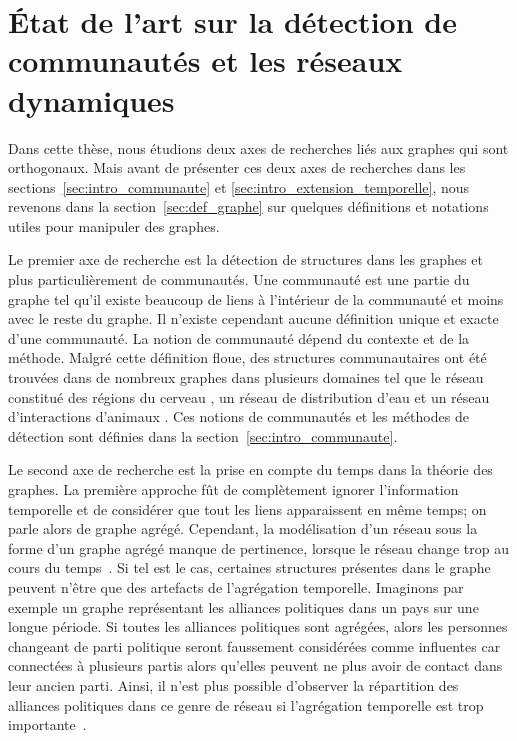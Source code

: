 
\chapter{État de l'art sur la détection de communautés et les réseaux dynamiques}
\minitoc
\label{chap:etat_art}
Dans cette thèse, nous étudions deux axes de recherches liés aux graphes qui sont orthogonaux.
Mais avant de présenter ces deux axes de recherches dans les sections~\ref{sec:intro_communaute} et \ref{sec:intro_extension_temporelle}, nous revenons dans la section~\ref{sec:def_graphe} sur quelques définitions et notations utiles pour manipuler des graphes.

Le premier axe de recherche est la détection de structures dans les graphes et plus particulièrement de communautés.
Une communauté est une partie du graphe tel qu'il existe beaucoup de liens à l'intérieur de la communauté et moins avec le reste du graphe.
Il n'existe cependant aucune définition unique et exacte d'une communauté.
La notion de communauté dépend du contexte et de la méthode.
Malgré cette définition floue, des structures communautaires ont été trouvées dans de nombreux graphes dans plusieurs domaines tel que le réseau constitué des régions du cerveau \cite{DeReus2014}, un réseau de distribution d'eau \cite{DiNardo2015} et un réseau d'interactions d'animaux \cite{Farine2015}.
Ces notions de communautés et les méthodes de détection sont définies dans la section~\ref{sec:intro_communaute}.

Le second axe de recherche est la prise en compte du temps dans la théorie des graphes.
La première approche fût de complètement ignorer l'information temporelle et de considérer que tout les liens apparaissent en même temps; on parle alors de graphe agrégé.
Cependant, la modélisation d'un réseau sous la forme d'un graphe agrégé manque de pertinence, lorsque le réseau change trop au cours du temps~\cite{Holme2015b}.
Si tel est le cas, certaines structures présentes dans le graphe peuvent n'être que des artefacts de l'agrégation temporelle.
Imaginons par exemple un graphe représentant les alliances politiques dans un pays sur une longue période.
Si toutes les alliances politiques sont agrégées, alors les personnes changeant de parti politique seront faussement considérées comme influentes car connectées à plusieurs partis alors qu'elles peuvent ne plus avoir de contact dans leur ancien parti.
Ainsi, il n'est plus possible d'observer la répartition des alliances politiques dans ce genre de réseau si l'agrégation temporelle est trop importante~\cite{Mucha2010}.

